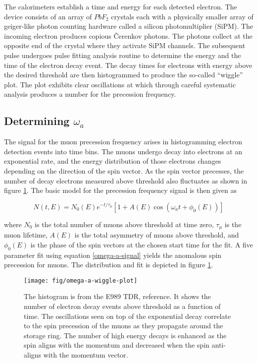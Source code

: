 The calorimeters establish a time and energy for each detected electron.  The device consists of an array of $PbF_2$ crystals each with a physically smaller array of geiger-like photon counting hardware called a silicon photomultiplier (SiPM).  The incoming electron produces copious \v{C}erenkov photons.  The photons collect at the opposite end of the crystal where they activate SiPM channels.  The subsequent pulse undergoes pulse fitting analysis routine to determine the energy and the time of the electron decay event.  The decay times for electrons with energy above the desired threshold are then histogrammed to produce the so-called ``wiggle'' plot.  The plot exhibits clear oscillations at \wa which through careful systematic analysis produces a number for the precession frequency.

\subsection{Determining $\omega_a$}

The signal for the muon precession frequency arises in histogramming electron detection events into time bins.  The muons undergo decay into electrons at an exponential rate, and the energy distribution of those electrons changes depending on the direction of the spin vector.  As the spin vector precesses, the number of decay electrons measured above threshold also fluctuates as shown in figure \ref{fig:omega-a-wiggle-plot}.  The basic model for the precession frequency signal is then given as 

\begin{equation}
\label{eqn:omega-a-signal}
N(t, E) = N_0(E) e^{-t/\tau_\mu} \left[ 1 + A(E) \cos(\omega_a t + \phi_0(E))\right]
\end{equation}

where $N_0$ is the total number of muons above threshold at time zero, $\tau_\mu$ is the muon lifetime, $A(E)$ is the total asymmetry of muons above threshold, and $\phi_0(E)$ is the phase of the spin vectors at the chosen start time for the fit.  A five parameter fit using equation \ref{omega-a-signal} yields the anomalous spin precession for muons.  The distribution and fit is depicted in figure \ref{fig:omega-a-wiggle-plot}.

\begin{figure}
\label{fig:omega-a-wiggle-plot}
\texttt{[image: fig/omega-a-wiggle-plot]}
\caption{The histogram is from the E989 TDR, reference\cite{e989-tdr}.  It shows the number of electron decay events above threshold as a function of time.  The oscillations seen on top of the exponential decay correlate to the spin precession of the muons as they propagate around the storage ring.  The number of high energy decays is enhanced as the spin aligns with the momentum and decreased when the spin anti-aligns with the momentum vector.}
\end{figure}

